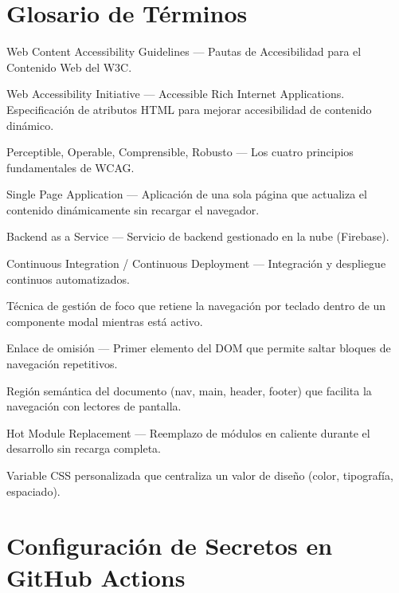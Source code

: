 \documentclass[12pt, a4paper]{report}
\begin{document}
\appendix
\chapter{Glosario de Términos}

\begin{description}[leftmargin=3cm, style=nextline]
  \item[WCAG] Web Content Accessibility Guidelines --- Pautas de Accesibilidad para el Contenido Web del W3C.
  \item[WAI-ARIA] Web Accessibility Initiative --- Accessible Rich Internet Applications. Especificación de atributos HTML para mejorar accesibilidad de contenido dinámico.
  \item[POUR] Perceptible, Operable, Comprensible, Robusto --- Los cuatro principios fundamentales de WCAG.
  \item[SPA] Single Page Application --- Aplicación de una sola página que actualiza el contenido dinámicamente sin recargar el navegador.
  \item[BaaS] Backend as a Service --- Servicio de backend gestionado en la nube (Firebase).
  \item[CI/CD] Continuous Integration / Continuous Deployment --- Integración y despliegue continuos automatizados.
  \item[Focus trap] Técnica de gestión de foco que retiene la navegación por teclado dentro de un componente modal mientras está activo.
  \item[SkipLink] Enlace de omisión --- Primer elemento del DOM que permite saltar bloques de navegación repetitivos.
  \item[Landmark] Región semántica del documento (nav, main, header, footer) que facilita la navegación con lectores de pantalla.
  \item[HMR] Hot Module Replacement --- Reemplazo de módulos en caliente durante el desarrollo sin recarga completa.
  \item[Token CSS] Variable CSS personalizada que centraliza un valor de diseño (color, tipografía, espaciado).
\end{description}

\chapter{Configuración de Secretos en GitHub Actions}
\end{document}
